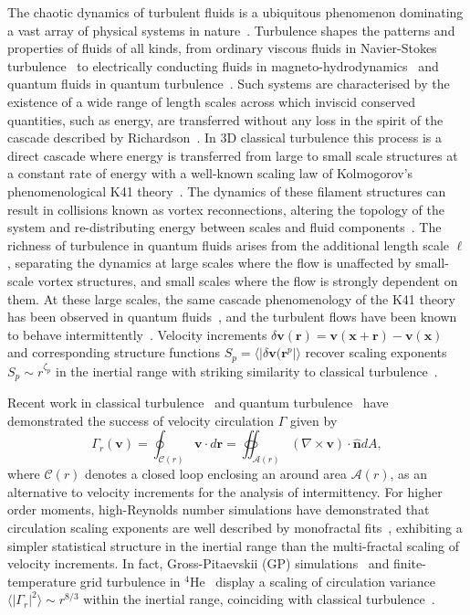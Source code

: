 \documentclass[%
 reprint,
 amsmath,amssymb,
 aps,
 prl,
]{revtex4-2}
\def\v{\mathbf{v}}
\def\x{\mathbf{x}}
\begin{document}
The chaotic dynamics of turbulent fluids is a ubiquitous phenomenon dominating a vast array of physical systems in nature~\cite{frisch1995}.
Turbulence shapes the patterns and properties of fluids of all kinds, from ordinary viscous fluids in Navier-Stokes turbulence~\cite{pope2000} to electrically conducting fluids in magneto-hydrodynamics~\cite{canuto1998} and quantum fluids in quantum turbulence~\cite{barenghi2023,barenghi2023a}.
Such systems are characterised by the existence of a wide range of length scales across which inviscid conserved quantities, such as energy, are transferred without any loss in the spirit of the cascade described by Richardson~\cite{richardson1922}.
In 3D classical turbulence this process is a direct cascade where energy is transferred from large to small scale structures at a constant rate of energy with a well-known scaling law of Kolmogorov's phenomenological K41 theory~\cite{kolmogorov1941}.
The dynamics of these filament structures can result in collisions known as vortex reconnections, altering the topology of the system and re-distributing energy between scales and fluid components~\cite{stasiak2024,stasiak2025}.
The richness of turbulence in quantum fluids arises from the additional length scale $\ell$, separating the dynamics at large scales where the flow is unaffected by small-scale vortex structures, and small scales where the flow is strongly dependent on them.
At these large scales, the same cascade phenomenology of the K41 theory has been observed in quantum fluids~\cite{barenghi2014}, and the turbulent flows have been known to behave intermittently~\cite{barenghi2023a}.
Velocity increments $\delta\v(\mathbf{r}) = \v(\x+\mathbf{r}) - \v(\x)$ and corresponding structure functions $S_p = \langle|\delta\v(\mathbf{r}^p|\rangle$ recover scaling exponents $S_p\sim r^{\zeta_p}$ in the inertial range with striking similarity to classical turbulence~\cite{maurer1998,rusaouen2017}.

Recent work in classical turbulence~\cite{iyer2019} and quantum turbulence~\cite{muller2021,polanco2021,muller2022,muller2024} have demonstrated the success of velocity circulation $\Gamma$ given by
\begin{equation}
	\Gamma_r(\v) = \oint_{\mathcal{C}(r)}\v\cdot d\mathbf{r} = \oiint_{\mathcal{A}(r)}(\nabla\times\v)\cdot\hat{\mathbf{n}}dA,
\end{equation}
where $\mathcal{C}(r)$ denotes a closed loop enclosing an around area $\mathcal{A}(r)$, as an alternative to velocity increments for the analysis of intermittency.
For higher order moments, high-Reynolds number simulations have demonstrated that circulation scaling exponents are well described by monofractal fits~\cite{iyer2019}, exhibiting a simpler statistical structure in the inertial range than the multi-fractal scaling of velocity increments.
In fact, Gross-Pitaevskii (GP) simulations~\cite{muller2021,polanco2021} and finite-temperature grid turbulence in $^4$He~\cite{muller2022} display a scaling of circulation variance $\langle|\Gamma_r|^2\rangle\sim r^{8/3}$ within the inertial range, coinciding with classical turbulence~\cite{frisch1995}.
\end{document}
